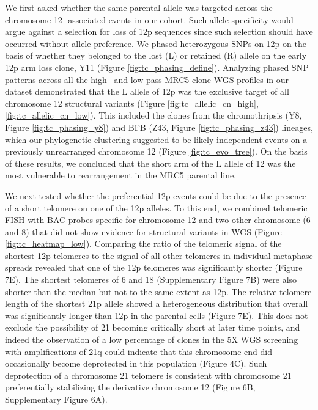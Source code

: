 \documentclass[phd,tocprelim]{cornell}
\begin{document}
We first asked whether the same parental allele was targeted across the chromosome 12- associated events in our cohort. Such allele specificity would argue against a selection for loss of 12p sequences since such selection should have occurred without allele preference. We phased heterozygous SNPs on 12p on the basis of whether they belonged to the lost (L) or retained (R) allele on the early 12p arm loss clone, Y11 (Figure \ref{fig:tc_phasing_define}). Analyzing phased SNP patterns across all the high– and low-pass MRC5 clone WGS profiles in our dataset demonstrated that the L allele of 12p was the exclusive target of all chromosome 12 structural variants (Figure \ref{fig:tc_allelic_cn_high}, \ref{fig:tc_allelic_cn_low}). This included the clones from the chromothripsis (Y8, Figure \ref{fig:tc_phasing_y8}) and BFB (Z43, Figure \ref{fig:tc_phasing_z43}) lineages, which our phylogenetic clustering suggested to be likely independent events on a previously unrearranged chromosome 12 (Figure \ref{fig:tc_evo_tree}). On the basis of these results, we concluded that the short arm of the L allele of 12 was the most vulnerable to rearrangement in the MRC5 parental line.

We next tested whether the preferential 12p events could be due to the presence of a short telomere on one of the 12p alleles. To this end, we combined telomeric FISH with BAC probes specific for chromosome 12 and two other chromosome (6 and 8) that did not show evidence for structural variants in WGS (Figure \ref{fig:tc_heatmap_low}). Comparing the ratio of the telomeric signal of the shortest 12p telomeres to the signal of all other telomeres in individual metaphase spreads revealed that one of the 12p telomeres was significantly shorter (Figure 7E). The shortest telomeres of 6 and 18 (Supplementary Figure 7B) were also shorter than the median but not to the same extent as 12p. The relative telomere length of the shortest 21p allele showed a heterogeneous distribution that overall was significantly longer than 12p in the parental cells (Figure 7E). This does not exclude the possibility of 21 becoming critically short at later time points, and indeed the observation of a low percentage of clones in the 5X WGS screening with amplifications of 21q could indicate that this chromosome end did occasionally become deprotected in this population (Figure 4C). Such deprotection of a chromosome 21 telomere is consistent with chromosome 21 preferentially stabilizing the derivative chromosome 12 (Figure 6B, Supplementary Figure 6A).
\end{document}
